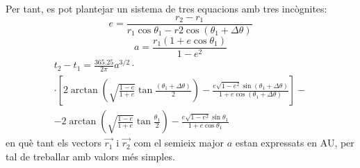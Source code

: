 Per tant, es pot plantejar un sistema de tres equacions amb tres incògnites:
\begin{equation}
e=\frac{r_{2}-r_{1}}{r_{1}\cos\theta_{1}-r{2}\cos\left(\theta_{1}+\Delta\theta\right)}
\label{eqe}
\end{equation}
\begin{equation}
a=\frac{r_{1}\left(1+e\cos\theta_{1}\right)}{1-e^{2}}
\label{eqa}
\end{equation}
\begin{multline}
	t_{2}-t_{1}=\frac{365.25}{2\pi}a^{3/2}\cdot \\
	\cdot\left[2\arctan\left(\sqrt{\frac{1-e}{1+e}}\tan\frac{\left(\theta_{1}+\Delta\theta\right)}{2}\right)-\frac{e\sqrt{1-e^{2}}\sin\left(\theta_{1}+\Delta\theta\right)}{1+e\cos\left(\theta_{1}+\Delta\theta\right)}\right]- \\
	-2\arctan\left(\sqrt{\frac{1-e}{1+e}}\tan\frac{\theta_{1}}{2}\right)-\frac{e\sqrt{1-e^{2}}\sin\theta_{1}}{1+e\cos\theta_{1}}
	\label{eqt}
\end{multline}
en què tant els vectors $\vec{r_{1}}$ i $\vec{r_{2}}$ com el semieix major $a$ estan expressats en AU, per tal de treballar amb valors més simples.

